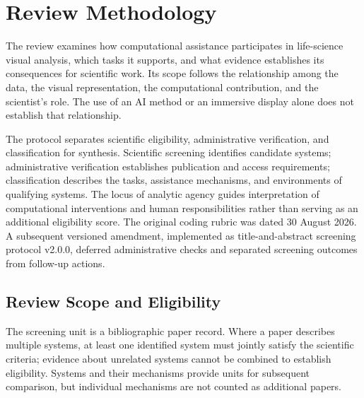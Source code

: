 
\section{Review Methodology}
\label{sec:methodology}

The review examines how computational assistance participates in life-science visual analysis, which tasks it supports, and what evidence establishes its consequences for scientific work. Its scope follows the relationship among the data, the visual representation, the computational contribution, and the scientist's role. The use of an AI method or an immersive display alone does not establish that relationship.

The protocol separates scientific eligibility, administrative verification, and classification for synthesis. Scientific screening identifies candidate systems; administrative verification establishes publication and access requirements; classification describes the tasks, assistance mechanisms, and environments of qualifying systems. The locus of analytic agency guides interpretation of computational interventions and human responsibilities rather than serving as an additional eligibility score. The original coding rubric was dated 30 August 2026. A subsequent versioned amendment, implemented as title-and-abstract screening protocol v2.0.0, deferred administrative checks and separated screening outcomes from follow-up actions.

\subsection{Review Scope and Eligibility}
\label{sec:methodology-scope}

The screening unit is a bibliographic paper record. Where a paper describes multiple systems, at least one identified system must jointly satisfy the scientific criteria; evidence about unrelated systems cannot be combined to establish eligibility. Systems and their mechanisms provide units for subsequent comparison, but individual mechanisms are not counted as additional papers.

